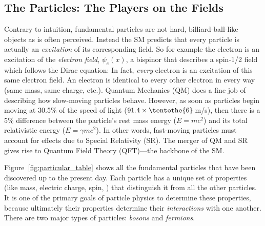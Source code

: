 \subsection{The Particles: The Players on the Fields}
Contrary to intuition, fundamental particles are not hard, billiard-ball-like objects as is often perceived.
Instead the SM predicts that every particle is actually an \emph{excitation} of its corresponding field.
So for example the electron is an excitation of the \emph{electron field}, $\psi_{e}(x)$, a bispinor that describes a spin-1/2 field which follows the Dirac equation: 
In fact, \emph{every} electron is an excitation of this same electron field. 
An electron is identical to every other electron in every way (same mass, same charge, etc.).
Quantum Mechanics (QM) does a fine job of describing how slow-moving particles behave.
However, as soon as particles begin moving at 30.5\% of the speed of light ($91.4 \times \tentothe{6}$\,m/s), then there is a 5\% difference between the particle's rest mass energy ($E = mc^2$) and its total relativistic energy ($E = \gamma mc^2$).
In other words, fast-moving particles must account for effects due to Special Relativity (SR).
The merger of QM and SR gives rise to Quantum Field Theory (QFT)---the backbone of the SM.

Figure~\ref{fig:particular_table} shows all the fundamental particles that have been discovered up to the present day.
Each particle has a unique set of properties (like mass, electric charge, spin, \etc) that distinguish it from all the other particles. 
It is one of the primary goals of particle physics to determine these properties, because ultimately their properties determine their \emph{interactions} with one another. 
There are two major types of particles: \emph{bosons} and \emph{fermions}.

